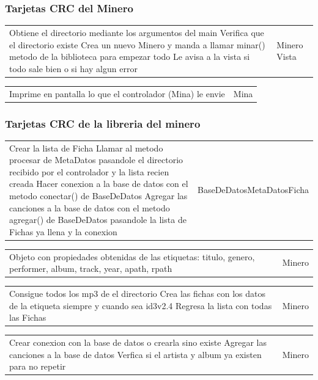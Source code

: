 \documentclass{article}
\newcommand{\tarjeta}[3]{%
      \begin{center}
      \begin{tabular}{|>{\raggedright\arraybackslash}p{7.8cm}|>{\raggedright\arraybackslash}p{4.2cm}|}
        \hline
        \multicolumn{2}{|c|}{#1} \\ \hline
        #2 & #3 \\ \hline
      \end{tabular}
      \end{center}
    }
\begin{document}
\subsubsection{Tarjetas CRC del Minero}

\tarjeta{Mina}
{Obtiene el directorio mediante los argumentos del main\newline
 Verifica que el directorio existe\newline
 Crea un nuevo Minero y manda a llamar minar() metodo de la biblioteca para empezar todo\newline
 Le avisa a la vista si todo sale bien o si hay algun error}
{Minero\newline
Vista}

\tarjeta{Vista}
{Imprime en pantalla lo que el controlador (Mina) le envie}
{Mina}

\subsubsection{Tarjetas CRC de la libreria del minero}
\tarjeta{Minero}
{Crear la lista de Ficha\newline
 Llamar al metodo procesar de MetaDatos pasandole el directorio recibido por el controlador y la lista recien creada\newline
 Hacer conexion a la base de datos con el metodo conectar() de BaseDeDatos\newline
 Agregar las canciones a la base de datos con el metodo agregar() de BaseDeDatos pasandole la lista de Fichas ya llena y la conexion}
{BaseDeDatos\newline MetaDatos\newline Ficha}

\tarjeta{Ficha}
{Objeto con propiedades obtenidas de las etiquetas:\newline
 titulo, genero, performer, album, track, year, apath, rpath}
{Minero}

\tarjeta{MetaDatos}
{Consigue todos los mp3 de el directorio\newline
 Crea las fichas con los datos de la etiqueta siempre y cuando sea id3v2.4\newline
 Regresa la lista con todas las Fichas}
{Minero}

\tarjeta{BaseDeDatos}
{Crear conexion con la base de datos o crearla sino existe\newline
 Agregar las canciones a la base de datos\newline
 Verfica si el artista y album ya existen para no repetir}
{Minero}
\end{document}
